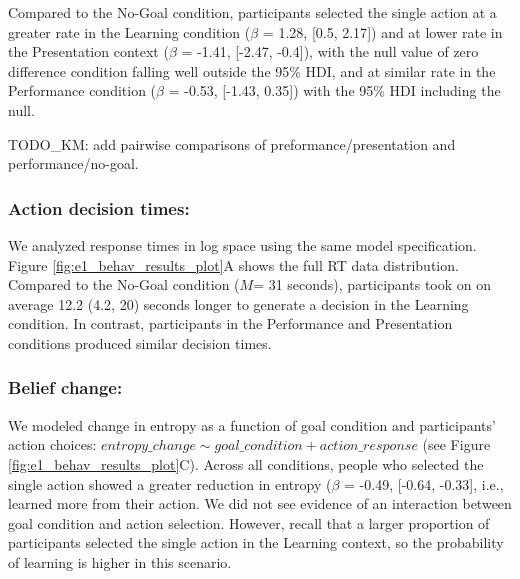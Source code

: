 \documentclass[10pt, letterpaper]{article}
\begin{document}
Compared to the No-Goal condition, participants selected the single
action at a greater rate in the Learning condition (\(\beta\) = 1.28,
{[}0.5, 2.17{]}) and at lower rate in the Presentation context
(\(\beta\) = -1.41, {[}-2.47, -0.4{]}), with the null value of zero
difference condition falling well outside the 95\% HDI, and at similar
rate in the Performance condition (\(\beta\) = -0.53, {[}-1.43, 0.35{]})
with the 95\% HDI including the null.

TODO\_KM: add pairwise comparisons of preformance/presentation and
performance/no-goal.

\subsubsection{Action decision times:}\label{action-decision-times}

We analyzed response times in log space using the same model
specification. Figure \ref{fig:e1_behav_results_plot}A shows the full RT
data distribution. Compared to the No-Goal condition (\(M\)= 31
seconds), participants took on on average 12.2 (4.2, 20) seconds longer
to generate a decision in the Learning condition. In contrast,
participants in the Performance and Presentation conditions produced
similar decision times.

\subsubsection{Belief change:}\label{belief-change}

We modeled change in entropy as a function of goal condition and
participants' action choices:
\texttt{$entropy\_change \sim goal\_condition + action\_response$} (see
Figure \ref{fig:e1_behav_results_plot}C). Across all conditions, people
who selected the single action showed a greater reduction in entropy
(\(\beta\) = -0.49, {[}-0.64, -0.33{]}, i.e., learned more from their
action. We did not see evidence of an interaction between goal condition
and action selection. However, recall that a larger proportion of
participants selected the single action in the Learning context, so the
probability of learning is higher in this scenario.
\end{document}
